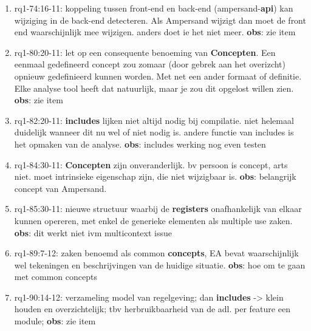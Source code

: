 \begin{enumerate}
    \item rq1-74:16-11: koppeling tussen front-end en back-end (ampersand-\textbf{api}) kan wijziging in de back-end detecteren. Als Ampersand wijzigt dan moet de front end waarschijnlijk mee wijzigen. anders doet ie het niet meer.
    \newline\textbf{obs}: zie item
    
    \item rq1-80:20-11: let op een consequente benoeming van \textbf{Concepten}. 
    Een eenmaal gedefineerd concept zou zomaar (door gebrek aan het overizcht) opnieuw gedefinieerd kunnen worden. 
    Met net een ander formaat of definitie. 
    Elke analyse tool heeft dat natuurlijk, maar je zou dit opgelost willen zien.
    \newline\textbf{obs}: zie item
    
    \item rq1-82:20-11: \textbf{includes} lijken niet altijd nodig bij compilatie. niet helemaal duidelijk wanneer dit nu wel of niet nodig is. 
    andere functie van includes is het opmaken van de analyse.
    \newline\textbf{obs}: includes werking nog even testen
    
    \item rq1-84:30-11: \textbf{Concepten} zijn onveranderlijk. bv persoon is concept, arts niet. 
    moet intrinsieke eigenschap zijn, die niet wijzigbaar is.
    \newline\textbf{obs}: belangrijk concept van Ampersand. 
    
    \item rq1-85:30-11: nieuwe structuur waarbij de \textbf{registers} onafhankelijk van elkaar kunnen opereren, met enkel de generieke elementen als multiple use zaken.
    \newline\textbf{obs}: dit werkt niet ivm multicontext issue
    
    \item rq1-89:7-12: zaken benoemd als common \textbf{concepts}, EA bevat waarschijnlijk wel tekeningen en beschrijvingen van de huidige situatie.
    \newline\textbf{obs}: hoe om te gaan met common concepts
    
    \item rq1-90:14-12: verzameling model van regelgeving; dan \textbf{includes} -> klein houden en overzichtelijk; tbv herbruikbaarheid van de adl.
    per feature een module;
    \newline\textbf{obs}: zie item
    

\end{enumerate}
